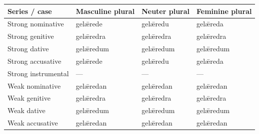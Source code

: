 \begin{tabular}{@{}>{\raggedright\arraybackslash}p{35.157mm}>{\raggedright\arraybackslash}p{28.195mm}>{\raggedright\arraybackslash}p{25.062mm}>{\raggedright\arraybackslash}p{27.151mm}@{}}
\toprule
\textbf{Series /\allowbreak{} case} & \textbf{Masculine plural} & \textbf{Neuter plural} & \textbf{Feminine plural} \\
\midrule
Strong nominative & gelǣrede & gelǣredu & gelǣreda \\
Strong genitive & gelǣredra & gelǣredra & gelǣredra \\
Strong dative & gelǣredum & gelǣredum & gelǣredum \\
Strong accusative & gelǣrede & gelǣredu & gelǣreda \\
Strong instrumental & — & — & — \\
Weak nominative & gelǣredan & gelǣredan & gelǣredan \\
Weak genitive & gelǣredra & gelǣredra & gelǣredra \\
Weak dative & gelǣredum & gelǣredum & gelǣredum \\
Weak accusative & gelǣredan & gelǣredan & gelǣredan \\
\bottomrule
\end{tabular}
\par\endgroup

